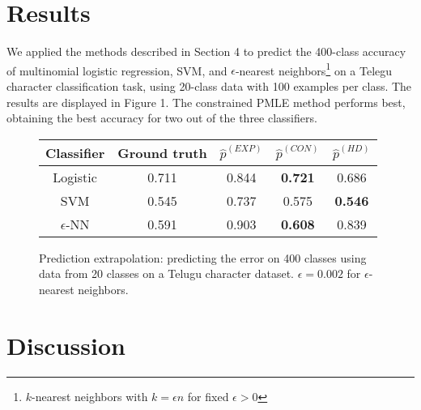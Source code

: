 \documentclass{article}
\begin{document}
\section{Results}

We applied the methods described in Section 4 to predict the 400-class accuracy of multinomial
logistic regression, SVM, and $\epsilon$-nearest neighbors\footnote{$k$-nearest neighbors with $k = \epsilon n$ for fixed $\epsilon > 0$} on a Telegu character classification task,
using 20-class data with 100 examples per class.  The results are displayed in Figure 1.
The constrained PMLE method performs best, obtaining the best accuracy for two out of the three classifiers.

\begin{figure}
\centering
\begin{tabular}{|c||c|c|c|c|}\hline
Classifier & Ground truth & $\hat{p}^{(EXP)}$ & $\hat{p}^{(CON)}$ & $\hat{p}^{(HD)}$\\ \hline
Logistic & 0.711 & 0.844 & \textbf{0.721} & 0.686 \\ \hline
SVM & 0.545 & 0.737 & 0.575 & \textbf{0.546} \\ \hline
$\epsilon$-NN & 0.591 & 0.903 & \textbf{0.608} & 0.839\\ \hline
\end{tabular}
\caption{Prediction extrapolation: predicting the error on 400 classes using data from 20 classes on a Telugu character dataset.
$\epsilon = 0.002$ for $\epsilon$-nearest neighbors.}
\end{figure}



\section{Discussion}
\end{document}
